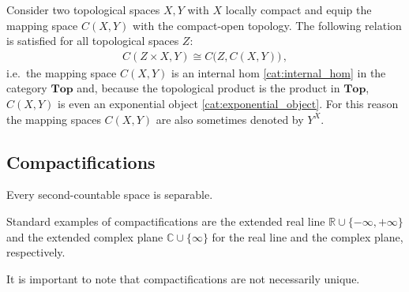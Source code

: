     \begin{property}\label{topology:internal_hom}
        Consider two topological spaces $X,Y$ with $X$ locally compact and equip the mapping space $C(X,Y)$ with the compact-open topology. The following relation is satisfied for all topological spaces $Z$:
        \begin{gather}
            C(Z\times X,Y)\cong C\big(Z,C(X,Y)\big)\,,
        \end{gather}
        i.e.~the mapping space $C(X,Y)$ is an internal hom \ref{cat:internal_hom} in the category $\mathbf{Top}$ and, because the topological product is the product in $\mathbf{Top}$, $C(X,Y)$ is even an exponential object \ref{cat:exponential_object}. For this reason the mapping spaces $C(X,Y)$ are also sometimes denoted by $Y^X$.
    \end{property}

\subsection{Compactifications}

    \begin{property}
        Every second-countable space is separable.
    \end{property}


    \begin{example}
        Standard examples of compactifications are the extended real line $\mathbb{R}\cup\{-\infty,+\infty\}$ and the extended complex plane $\mathbb{C}\cup\{\infty\}$ for the real line and the complex plane, respectively.
    \end{example}
    \begin{remark*}
        It is important to note that compactifications are not necessarily unique.
    \end{remark*}

